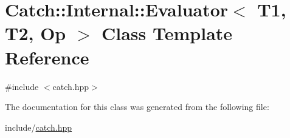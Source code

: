 \hypertarget{class_catch_1_1_internal_1_1_evaluator}{}\section{Catch\+:\+:Internal\+:\+:Evaluator$<$ T1, T2, Op $>$ Class Template Reference}
\label{class_catch_1_1_internal_1_1_evaluator}


{\ttfamily \#include $<$catch.\+hpp$>$}



The documentation for this class was generated from the following file\+:\begin{DoxyCompactItemize}
\item 
include/\mbox{\hyperlink{catch_8hpp}{catch.\+hpp}}\end{DoxyCompactItemize}

